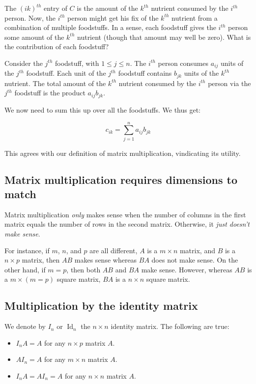 \documentclass[10pt]{amsart}
\begin{document}
The $(ik)^{th}$ entry of $C$ is the amount of the $k^{th}$ nutrient
consumed by the $i^{th}$ person. Now, the $i^{th}$ person might get
his fix of the $k^{th}$ nutrient from a combination of multiple
foodstuffs. In a sense, each foodstuff gives the $i^{th}$ person some
amount of the $k^{th}$ nutrient (though that amount may well be
zero). What is the contribution of each foodstuff?

Consider the $j^{th}$ foodstuff, with $1 \le j \le n$. The $i^{th}$
person consumes $a_{ij}$ units of the $j^{th}$ foodstuff. Each unit of
the $j^{th}$ foodstuff contains $b_{jk}$ units of the $k^{th}$
nutrient. The total amount of the $k^{th}$ nutrient consumed by the
$i^{th}$ person via the $j^{th}$ foodstuff is the product
$a_{ij}b_{jk}$.

We now need to sum this up over all the foodstuffs. We thus get:

$$c_{ik} = \sum_{j=1}^n a_{ij}b_{jk}$$

This agrees with our definition of matrix multiplication, vindicating
its utility.
\subsection{Matrix multiplication requires dimensions to match}

Matrix multiplication {\em only} makes sense when the number of
columns in the first matrix equals the number of rows in the second
matrix. Otherwise, it {\em just doesn't make sense}.

For instance, if $m$, $n$, and $p$ are all different, $A$ is a $m
\times n$ matrix, and $B$ is a $n \times p$ matrix, then $AB$ makes
sense whereas $BA$ does not make sense. On the other hand, if $m = p$,
then both $AB$ and $BA$ make sense. However, whereas $AB$ is a $m
\times (m = p)$ square matrix, $BA$ is a $n \times n$ square matrix.

\subsection{Multiplication by the identity matrix}

We denote by $I_n$ or $\operatorname{Id}_n$ the $n \times n$ identity
matrix. The following are true:

\begin{itemize}
\item $I_nA = A$ for any $n \times p$ matrix $A$.
\item $AI_n = A$ for any $m \times n$ matrix $A$.
\item $I_nA = AI_n = A$ for any $n \times n$ matrix $A$.
\end{itemize}
\end{document}
